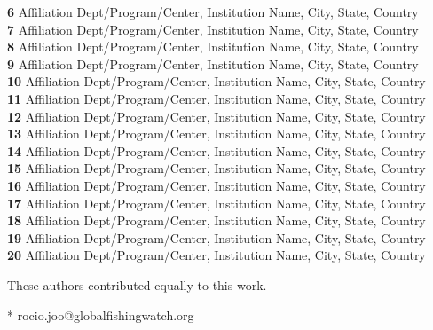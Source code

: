 \documentclass[10pt,letterpaper]{article}
\begin{document}
\begin{flushleft}
\textbf{6} Affiliation Dept/Program/Center, Institution Name, City, State, Country
\\
\textbf{7} Affiliation Dept/Program/Center, Institution Name, City, State, Country
\\
\textbf{8} Affiliation Dept/Program/Center, Institution Name, City, State, Country
\\
\textbf{9} Affiliation Dept/Program/Center, Institution Name, City, State, Country
\\
\textbf{10} Affiliation Dept/Program/Center, Institution Name, City, State, Country
\\
\textbf{11} Affiliation Dept/Program/Center, Institution Name, City, State, Country
\\
\textbf{12} Affiliation Dept/Program/Center, Institution Name, City, State, Country
\\
\textbf{13} Affiliation Dept/Program/Center, Institution Name, City, State, Country
\\
\textbf{14} Affiliation Dept/Program/Center, Institution Name, City, State, Country
\\
\textbf{15} Affiliation Dept/Program/Center, Institution Name, City, State, Country
\\
\textbf{16} Affiliation Dept/Program/Center, Institution Name, City, State, Country
\\
\textbf{17} Affiliation Dept/Program/Center, Institution Name, City, State, Country
\\
\textbf{18} Affiliation Dept/Program/Center, Institution Name, City, State, Country
\\
\textbf{19} Affiliation Dept/Program/Center, Institution Name, City, State, Country
\\
\textbf{20} Affiliation Dept/Program/Center, Institution Name, City, State, Country
\\
\bigskip

% 
%
\Yinyang These authors contributed equally to this work.




* rocio.joo@globalfishingwatch.org

\end{flushleft}
\end{document}

